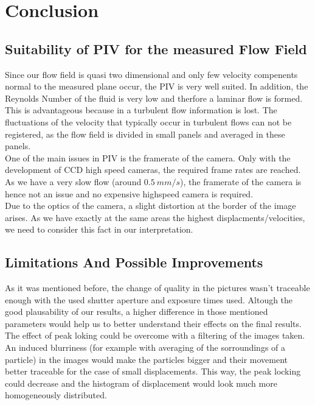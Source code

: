 \chapter{Conclusion}\label{sec:conclusion}






\section{Suitability of PIV for the measured Flow Field}
Since our flow field is quasi two dimensional and only few velocity compenents normal to the measured plane occur,  the PIV is very well suited. In addition, the Reynolds Number of the fluid is very low and therfore a laminar flow is formed. This is advantageous because in a turbulent flow information is lost. The fluctuations of the velocity that typically occur in turbulent flows can not be registered, as the flow field is divided in small panels and averaged in these panels.\\

One of the main issues in PIV is the framerate of the camera. Only with the development of CCD high speed cameras, the required frame rates are reached. As we have a very slow flow (around $0.5\ mm/s$), the framerate of the camera is hence not an issue and no expensive highspeed camera is required. \\

Due to the optics of the camera, a slight distortion at the border of the image arises. As we have exactly at the same areas the highest displacments/velocities, we need to consider this fact in our interpretation.

\section{Limitations And Possible Improvements}

As it was mentioned before, the change of quality in the pictures wasn't traceable enough with the used shutter aperture and exposure times used. Altough the good plausability of our results, a higher difference in those mentioned parameters would help us to better understand their effects on the final results. \\

The effect of peak loking could be overcome with a filtering of the images taken. An induced blurriness (for example with averaging of the sorroundings of a particle) in the images would make the particles bigger and their movement better traceable for the case of small displacements. This way, the peak locking could decrease and the histogram of displacement would look much more homogeneously distributed.